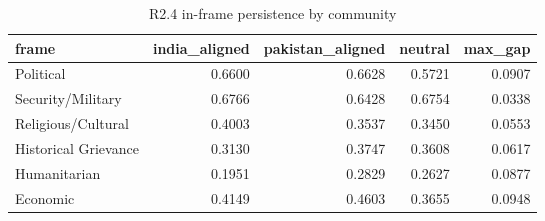 \begin{table}
\caption{R2.4 in-frame persistence by community}
\label{tab:r1r2_community_persistence}
\begin{tabular}{lrrrr}
\toprule
frame & india\_aligned & pakistan\_aligned & neutral & max\_gap \\
\midrule
Political & 0.6600 & 0.6628 & 0.5721 & 0.0907 \\
Security/Military & 0.6766 & 0.6428 & 0.6754 & 0.0338 \\
Religious/Cultural & 0.4003 & 0.3537 & 0.3450 & 0.0553 \\
Historical Grievance & 0.3130 & 0.3747 & 0.3608 & 0.0617 \\
Humanitarian & 0.1951 & 0.2829 & 0.2627 & 0.0877 \\
Economic & 0.4149 & 0.4603 & 0.3655 & 0.0948 \\
\bottomrule
\end{tabular}
\end{table}
